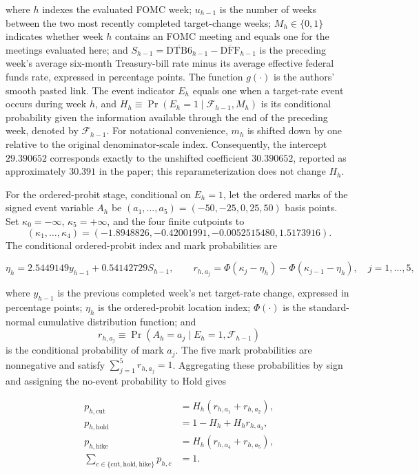 where \(h\) indexes the evaluated FOMC week; \(u_{h-1}\) is the number of
weeks between the two most recently completed target-change weeks;
\(M_h\in\{0,1\}\) indicates whether week \(h\) contains an FOMC meeting and
equals one for the meetings evaluated here; and
\(S_{h-1}=\overline{\mathrm{DTB6}}_{h-1}
-\overline{\mathrm{DFF}}_{h-1}\) is the preceding week's average six-month
Treasury-bill rate minus its average effective federal funds rate, expressed
in percentage points. The function \(g(\cdot)\) is the authors' smooth pasted
link. The event indicator \(E_h\) equals one when a target-rate event occurs
during week \(h\), and
\(H_h\equiv\Pr(E_h=1\mid\mathcal{F}_{h-1},M_h)\) is its conditional
probability given the information available through the end of the preceding
week, denoted by \(\mathcal{F}_{h-1}\). For notational convenience,
\(m_h\) is shifted down by one relative to the original denominator-scale
index. Consequently, the intercept \(29.390652\) corresponds exactly to the
unshifted coefficient \(30.390652\), reported as approximately \(30.391\) in
the paper; this reparameterization does not change \(H_h\).

For the ordered-probit stage, conditional on \(E_h=1\), let the ordered marks
of the signed event variable \(A_h\) be
\((a_1,\ldots,a_5)=(-50,-25,0,25,50)\) basis points. Set
\(\kappa_0=-\infty\), \(\kappa_5=+\infty\), and the four finite cutpoints to
\[
(\kappa_1,\ldots,\kappa_4)
=
(-1.8948826,-0.42001991,-0.0052515480,1.5173916).
\]
The conditional ordered-probit index and mark probabilities are

\begin{equation}
    \eta_h=2.5449149y_{h-1}+0.54142729S_{h-1},
    \qquad
    r_{h,a_j}
    =\Phi(\kappa_j-\eta_h)-\Phi(\kappa_{j-1}-\eta_h),
    \quad j=1,\ldots,5,
    \label{eq:ch2:decision_hj_op}
\end{equation}

where \(y_{h-1}\) is the previous completed week's net target-rate change,
expressed in percentage points; \(\eta_h\) is the ordered-probit location
index; \(\Phi(\cdot)\) is the standard-normal cumulative distribution
function; and
\[
r_{h,a_j}
\equiv
\Pr(A_h=a_j\mid E_h=1,\mathcal{F}_{h-1})
\]
is the conditional probability of mark \(a_j\). The five mark probabilities
are nonnegative and satisfy
\(\sum_{j=1}^{5}r_{h,a_j}=1\). Aggregating these probabilities by sign and
assigning the no-event probability to Hold gives

\begin{equation}
\begin{aligned}
    p_{h,\mathrm{cut}}
    &=H_h(r_{h,a_1}+r_{h,a_2}),\\
    p_{h,\mathrm{hold}}
    &=1-H_h+H_h r_{h,a_3},\\
    p_{h,\mathrm{hike}}
    &=H_h(r_{h,a_4}+r_{h,a_5}),\\
    \sum_{c\in\{\mathrm{cut},\mathrm{hold},\mathrm{hike}\}}p_{h,c}
    &=1.
\end{aligned}
    \label{eq:ch2:decision_hj_direction}
\end{equation}

